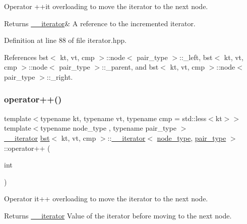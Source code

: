 Operator ++it overloading to move the iterator to the next node. 

\begin{DoxyReturn}{Returns}
\hyperlink{classbst_1_1____iterator}{\+\_\+\+\_\+iterator}\& A reference to the incremented iterator. 
\end{DoxyReturn}


Definition at line 88 of file iterator.\+hpp.



References bst$<$ kt, vt, cmp $>$\+::node$<$ pair\+\_\+type $>$\+::\+\_\+left, bst$<$ kt, vt, cmp $>$\+::node$<$ pair\+\_\+type $>$\+::\+\_\+parent, and bst$<$ kt, vt, cmp $>$\+::node$<$ pair\+\_\+type $>$\+::\+\_\+right.

\mbox{\label{classbst_1_1____iterator_a0a43380fa33e82342236ef747a5e72e2}} 
\subsubsection{\texorpdfstring{operator++()}{operator++()}\hspace{0.1cm}{\footnotesize\ttfamily [2/2]}}
{\footnotesize\ttfamily template$<$typename kt, typename vt, typename cmp = std\+::less$<$kt$>$$>$ \\
template$<$typename node\+\_\+type , typename pair\+\_\+type $>$ \\
\hyperlink{classbst_1_1____iterator}{\+\_\+\+\_\+iterator} \hyperlink{classbst}{bst}$<$ kt, vt, cmp $>$\+::\hyperlink{classbst_1_1____iterator}{\+\_\+\+\_\+iterator}$<$ \hyperlink{classbst_a062eb2a1ac54802dbc4f0f74ae2afd01}{node\+\_\+type}, \hyperlink{classbst_a7b11cca2a3b4394915600194f741ab16}{pair\+\_\+type} $>$\+::operator++ (\begin{DoxyParamCaption}\item[{int}]{ }\end{DoxyParamCaption})\hspace{0.3cm}{\ttfamily [inline]}}



Operator it++ overloading to move the iterator to the next node. 

\begin{DoxyReturn}{Returns}
\hyperlink{classbst_1_1____iterator}{\+\_\+\+\_\+iterator} Value of the iterator before moving to the next node. 
\end{DoxyReturn}


